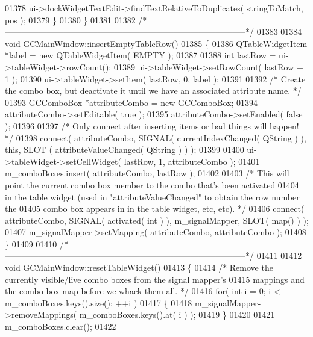 \begin{DoxyCode}
{{{{{{{01378     ui->dockWidgetTextEdit->findTextRelativeToDuplicates( stringToMatch, pos );
01379   \}
01380 \}
01381 
01382 \textcolor{comment}{/*
      --------------------------------------------------------------------------------------*/}
01383 
01384 \textcolor{keywordtype}{void} GCMainWindow::insertEmptyTableRow()
01385 \{
01386   QTableWidgetItem *label = \textcolor{keyword}{new} QTableWidgetItem( EMPTY );
01387 
01388   \textcolor{keywordtype}{int} lastRow = ui->tableWidget->rowCount();
01389   ui->tableWidget->setRowCount( lastRow + 1 );
01390   ui->tableWidget->setItem( lastRow, 0, label );
01391 
01392   \textcolor{comment}{/* Create the combo box, but deactivate it until we have an associated
       attribute name. */}
01393   \hyperlink{class_g_c_combo_box}{GCComboBox} *attributeCombo = \textcolor{keyword}{new} \hyperlink{class_g_c_combo_box}{GCComboBox};
01394   attributeCombo->setEditable( \textcolor{keyword}{true} );
01395   attributeCombo->setEnabled( \textcolor{keyword}{false} );
01396 
01397   \textcolor{comment}{/* Only connect after inserting items or bad things will happen! */}
01398   connect( attributeCombo, SIGNAL( currentIndexChanged( QString ) ), \textcolor{keyword}{this}, SLOT
      ( attributeValueChanged( QString ) ) );
01399 
01400   ui->tableWidget->setCellWidget( lastRow, 1, attributeCombo );
01401   m\_comboBoxes.insert( attributeCombo, lastRow );
01402 
01403   \textcolor{comment}{/* This will point the current combo box member to the combo that's been
       activated}
01404 \textcolor{comment}{    in the table widget (used in "attributeValueChanged" to obtain the row
       number the}
01405 \textcolor{comment}{    combo box appears in in the table widget, etc, etc). */}
01406   connect( attributeCombo, SIGNAL( activated( \textcolor{keywordtype}{int} ) ), m\_signalMapper, SLOT( 
      map() ) );
01407   m\_signalMapper->setMapping( attributeCombo, attributeCombo );
01408 \}
01409 
01410 \textcolor{comment}{/*
      --------------------------------------------------------------------------------------*/}
01411 
01412 \textcolor{keywordtype}{void} GCMainWindow::resetTableWidget()
01413 \{
01414   \textcolor{comment}{/* Remove the currently visible/live combo boxes from the signal mapper's}
01415 \textcolor{comment}{    mappings and the combo box map before we whack them all. */}
01416   \textcolor{keywordflow}{for}( \textcolor{keywordtype}{int} i = 0; i < m\_comboBoxes.keys().size(); ++i )
01417   \{
01418     m\_signalMapper->removeMappings( m\_comboBoxes.keys().at( i ) );
01419   \}
01420 
01421   m\_comboBoxes.clear();
01422 
}}}}}}}
\end{DoxyCode}
